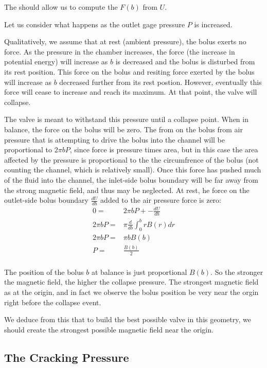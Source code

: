 \documentclass{asme2ej}
\begin{document}
The should allow us to compute the $F(b)$ from $U$.

Let us consider what happens as the outlet gage pressure $P$ is increased.

Qualitatively, we assume that at rest (ambient pressure), the bolus exerts no force. As the
pressure in the chamber increases, the force (the increase in potential energy) will increase
as $b$ is decreased and the bolus is disturbed from its rest position. This force on the
bolus and resiting force exerted by the bolus will increase
as $b$ decreased further from its rest postion. However, eventually this force will cease to
increase and reach its maximum. At that point, the valve will collapse.

The valve is meant to withstand this pressure until a collapse point.
When in balance, the force on the bolus will be zero.
The from on the bolus from air pressure that is attempting to drive the
bolus into the channel will be proportional to $2 \pi b P$, since force is pressure times
area, but in this case the area affected by the pressure is proportional
to the the circumfrence of the bolus (not counting the channel, which is relatively small).
Once this force has pushed much of the fluid into the channel, the inlet-side
bolus boundary will be far away
from the strong magnetic field, and thus may be neglected.
At rest,
he force on the outlet-side bolus boundary $\frac{d U}{db}$ added to the air pressure
force is zero:
\begin{align}
  0 = & 2 \pi b P + - \frac{d U}{db} \\
  2\pi b P = & \pi \frac{d }{db} \int_0^b r B(r) dr \\
  2\pi b P = &  \pi  b B(b)  \\
    P = &  \frac{B(b)}{2}  \\
\end{align}

The position of the bolus $b$ at balance is just proportional $B(b)$.
So the stronger the magnetic field, the higher the collapse pressure.
The strongest magnetic field as at the origin, and in fact we observe the bolus
position be very near the orgin right before the collapse event.

We deduce from this that to build the best possible valve in this geometry,
we should create the strongest possible magnetic field near the origin.


\subsection{The Cracking Pressure}
\end{document}
